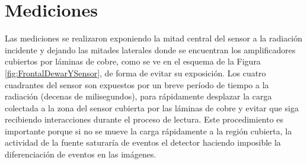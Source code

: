 \section{Mediciones \label{sec:Mediciones}}


\noindent Las mediciones se realizaron exponiendo la mitad central del sensor a la radiación incidente y dejando las mitades laterales donde se encuentran los amplificadores cubiertos por láminas de cobre, como se ve en el esquema de la Figura \ref{fig:FrontalDewarYSensor}, de forma de evitar su exposición. Los cuatro cuadrantes del sensor son expuestos por un breve período de tiempo a la radiación (decenas de milisegundos), para rápidamente desplazar la carga colectada a la zona del sensor cubierta por las láminas de cobre y evitar que siga recibiendo interacciones durante el proceso de lectura. %
Este procedimiento es importante porque si no se mueve la carga rápidamente a la región cubierta, la actividad de la fuente saturaría de eventos el detector haciendo imposible la diferenciación de eventos en las imágenes.


